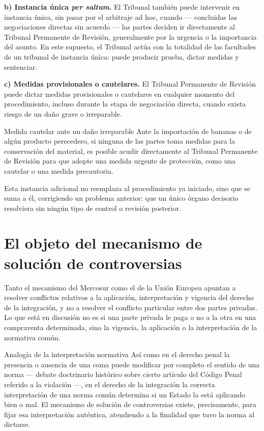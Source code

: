 \documentclass[12pt,oneside]{book}
\begin{document}
\textbf{b) Instancia única \textit{per saltum}.} El Tribunal también puede intervenir en instancia única, sin pasar por el arbitraje ad hoc, cuando --- concluidas las negociaciones directas sin acuerdo --- las partes deciden ir directamente al Tribunal Permanente de Revisión, generalmente por la urgencia o la importancia del asunto. En este supuesto, el Tribunal actúa con la totalidad de las facultades de un tribunal de instancia única: puede producir prueba, dictar medidas y sentenciar.

\textbf{c) Medidas provisionales o cautelares.} El Tribunal Permanente de Revisión puede dictar medidas provisionales o cautelares en cualquier momento del procedimiento, incluso durante la etapa de negociación directa, cuando exista riesgo de un daño grave o irreparable.

\begin{example}{Medida cautelar ante un daño irreparable}
Ante la importación de bananas o de algún producto perecedero, si ninguna de las partes toma medidas para la conservación del material, es posible acudir directamente al Tribunal Permanente de Revisión para que adopte una medida urgente de protección, como una cautelar o una medida precautoria.
\end{example}

Esta instancia adicional no reemplaza al procedimiento ya iniciado, sino que se suma a él, corrigiendo un problema anterior: que un único órgano decisorio resolviera sin ningún tipo de control o revisión posterior.

\section{El objeto del mecanismo de solución de controversias}

Tanto el mecanismo del Mercosur como el de la Unión Europea apuntan a resolver conflictos relativos a la aplicación, interpretación y vigencia del derecho de la integración, y no a resolver el conflicto particular entre dos partes privadas. Lo que está en discusión no es si una parte privada le paga o no a la otra en una compraventa determinada, sino la vigencia, la aplicación o la interpretación de la normativa común.

\begin{example}{Analogía de la interpretación normativa}
Así como en el derecho penal la presencia o ausencia de una coma puede modificar por completo el sentido de una norma --- debate doctrinario histórico sobre cierto artículo del Código Penal referido a la violación ---, en el derecho de la integración la correcta interpretación de una norma común determina si un Estado la está aplicando bien o mal. El mecanismo de solución de controversias existe, precisamente, para fijar esa interpretación auténtica, atendiendo a la finalidad que tuvo la norma al dictarse.
\end{example}
\end{document}
